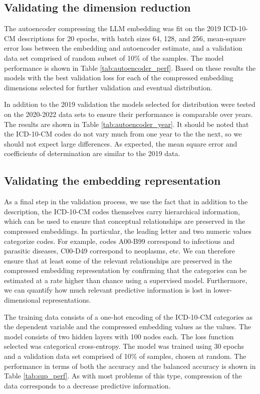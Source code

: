 \documentclass{bmcart}
\begin{document}
\subsection*{Validating the dimension reduction}

The autoencoder compressing the LLM embedding was fit on the 2019 ICD-10-CM 
descriptions for 20 epochs, with batch sizes 64, 128, and 256, mean-square 
error loss between the embedding and autoencoder estimate, and a validation 
data set comprised of random subset of 10\% of the samples. The model 
performance is shown in Table \ref{tab:autoencoder_perf}.  
Based on these results the models with the best 
validation loss for each of the compressed embedding dimensions selected 
for further validation and eventual distribution.

In addition to the 2019 validation the models selected for distribution were
tested on the 2020-2022 data sets to ensure their performance is comparable
over years. The results are shown in Table \ref{tab:autoencoder_year}. 
It should be noted that the ICD-10-CM codes do not vary much from
one year to the the next, so we should not expect large differences. As 
expected, the mean square error and coefficients of determination are similar 
to the 2019 data.

\subsection*{Validating the embedding representation}

As a final step in the validation process, we use the fact that in addition to
the description, the ICD-10-CM codes themselves carry hierarchical information,
which can be used to ensure that conceptual relationships are preserved
in the compressed embeddings. In particular, the leading letter and two 
numeric values categorize codes. For example, codes A00-B99 correspond to
infectious and parasitic diseases, C00-D49 correspond to neoplasms, etc. We
can therefore ensure that at least some of the relevant relationships are 
preserved in the compressed embedding representation by confirming that
the categories can be estimated at a rate higher than chance using a 
supervised model. Furthermore, we can quantify how much relevant predictive
information is lost in lower-dimensional representations.

The training data consists of a one-hot encoding of the ICD-10-CM
categories as the dependent variable and the compressed embedding values as
the values. The model consists of two hidden layers with 100
nodes each. The loss function selected was categorical cross-entropy. The
model was trained using 30 epochs and a validation data set comprised of 10\% of
samples, chosen at random. The performance in terms of both the accuracy and
the balanced accuracy is shown in Table \ref{tab:sup_perf}. As
with most problems of this type, compression of the data corresponds to
a decrease predictive information.
\end{document}
